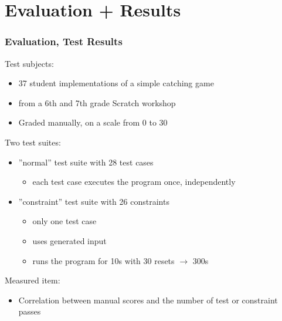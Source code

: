 \section{Evaluation + Results}

\begin{frame}
\end{frame}

\begin{frame}
\end{frame}

\begin{frame}\frametitle{Evaluation, Test Results}
    Test subjects:
    \begin{itemize}
        \item \textcolor{upfim}{37 student implementations} of a simple catching game
        \item from a 6th and 7th grade Scratch workshop~\cite{keller}
        \item \textcolor{upfim}{Graded manually}, on a scale from 0 to 30
    \end{itemize}

    \pause
    \bigskip

    Two test suites:
    \begin{itemize}
        \item \textcolor{upfim}{''normal'' test suite} with 28 test cases
            \begin{itemize}
                \item each test case executes the program once, independently
            \end{itemize}
        \item \textcolor{upfim}{''constraint'' test suite} with 26 constraints
            \begin{itemize}
                \item only one test case
                \item uses generated input
                \item runs the program for 10s with 30 resets $\rightarrow$ 300s
            \end{itemize}
    \end{itemize}

    \pause
    \bigskip

    Measured item:
    \begin{itemize}
        \item \textcolor{upfim}{Correlation} between manual scores and the number of test or constraint passes
    \end{itemize}
\end{frame}

